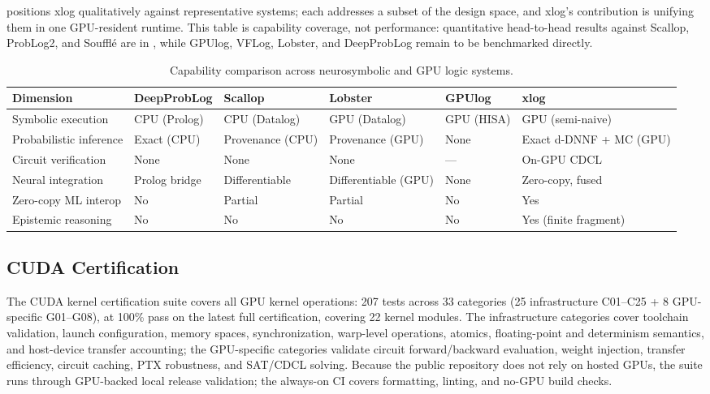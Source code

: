  positions xlog qualitatively against representative systems; each addresses a subset of the design space, and xlog's contribution is unifying them in one GPU-resident runtime. This table is capability coverage, not performance: quantitative head-to-head results against Scallop, ProbLog2, and Soufflé are in , while GPUlog, VFLog, Lobster, and DeepProbLog remain to be benchmarked directly.

\begin{table}[htbp]
  \centering
  \caption{Capability comparison across neurosymbolic and GPU logic systems.}
  \label{tab:comparison}
  \small
  \begin{tabularx}{\linewidth}{@{}l L L L L L@{}}
    \toprule
    \textbf{Dimension} & \textbf{DeepProbLog} & \textbf{Scallop} & \textbf{Lobster} & \textbf{GPUlog} & \textbf{xlog} \\
    \midrule
    Symbolic execution      & CPU (Prolog) & CPU (Datalog)    & GPU (Datalog)      & GPU (HISA) & GPU (semi-naive) \\
    Probabilistic inference & Exact (CPU)  & Provenance (CPU) & Provenance (GPU)   & None       & Exact d-DNNF + MC (GPU) \\
    Circuit verification    & None         & None             & None               & ---        & On-GPU CDCL \\
    Neural integration      & Prolog bridge & Differentiable  & Differentiable (GPU) & None     & Zero-copy, fused \\
    Zero-copy ML interop    & No           & Partial          & Partial            & No         & Yes \\
    Epistemic reasoning     & No           & No               & No                 & No         & Yes (finite fragment) \\
    \bottomrule
  \end{tabularx}
\end{table}

\subsection{CUDA Certification}

The CUDA kernel certification suite covers all GPU kernel operations: 207 tests across 33 categories (25 infrastructure C01--C25 + 8 GPU-specific G01--G08), at 100\% pass on the latest full certification, covering 22 kernel modules. The infrastructure categories cover toolchain validation, launch configuration, memory spaces, synchronization, warp-level operations, atomics, floating-point and determinism semantics, and host-device transfer accounting; the GPU-specific categories validate circuit forward/backward evaluation, weight injection, transfer efficiency, circuit caching, PTX robustness, and SAT/CDCL solving. Because the public repository does not rely on hosted GPUs, the suite runs through GPU-backed local release validation; the always-on CI covers formatting, linting, and no-GPU build checks.
